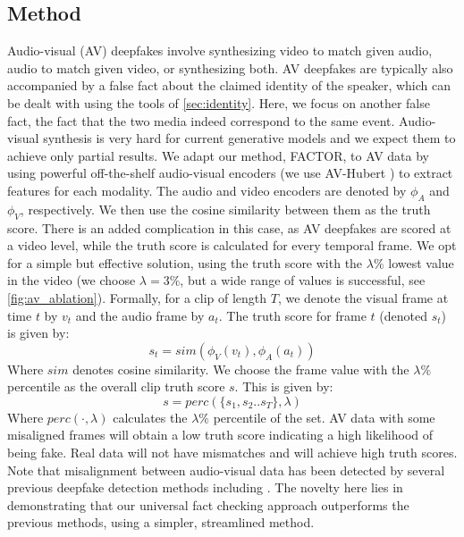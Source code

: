 \documentclass{article} \usepackage{iclr2024_conference,times}
\begin{document}
\subsection{Method}
Audio-visual (AV) deepfakes involve synthesizing video to match given audio, audio to match given video, or synthesizing both. AV deepfakes are typically also accompanied by a false fact about the claimed identity of the speaker, which can be dealt with using the tools of \cref{sec:identity}. Here, we focus on another false fact, the fact that the two media indeed correspond to the same event. Audio-visual synthesis is very hard for current generative models and we expect them to achieve only partial results. We adapt our method, FACTOR, to AV data by using powerful off-the-shelf audio-visual encoders (we use AV-Hubert \citep{avhubert}) to extract features for each modality. The audio and video encoders are denoted by $\phi_A$ and $\phi_V$, respectively. We then use the cosine similarity between them as the truth score. There is an added complication in this case, as AV deepfakes are scored at a video level, while the truth score is calculated for every temporal frame. We opt for a simple but effective solution, using the truth score with the $\lambda\%$ lowest value in the video (we choose $\lambda=3\%$, but a wide range of values is successful, see \cref{fig:av_ablation}). Formally, for a clip of length $T$, we denote the visual frame at time $t$ by $v_t$ and the audio frame by $a_t$. The truth score for frame $t$ (denoted $s_t$) is given by:
\begin{equation}
s_t = sim(\phi_V(v_t), \phi_A(a_t))
\end{equation}
Where $sim$ denotes cosine similarity. We choose the frame value with the $\lambda\%$ percentile as the overall clip truth score $s$. This is given by:
\begin{equation}
s = perc(\{s_1,s_2..s_T\},\lambda)
\end{equation}
Where $perc(\cdot, \lambda)$ calculates the $\lambda\%$ percentile of the set. AV data with some misaligned frames will obtain a low truth score indicating a high likelihood of being fake. Real data will not have mismatches and will achieve high truth scores. Note that misalignment between audio-visual data has been detected by several previous deepfake detection methods including \citet{owens}. The novelty here lies in demonstrating that our universal fact checking approach outperforms the previous methods, using a simpler, streamlined method.
\end{document}
